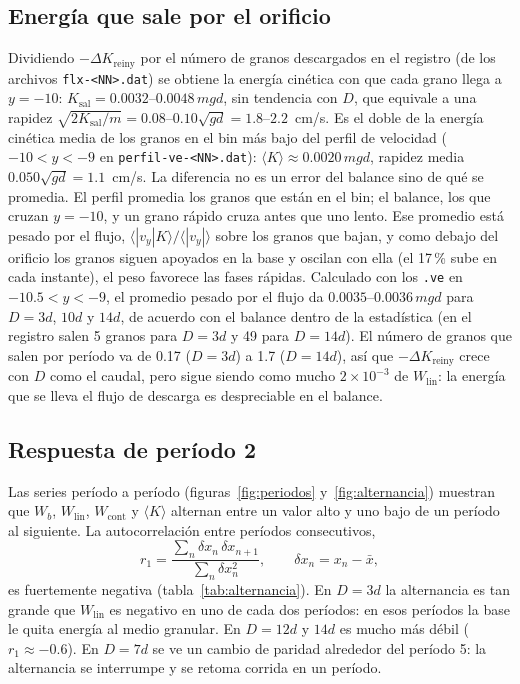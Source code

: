 \documentclass[11pt,a4paper]{article}
\newcommand{\code}[1]{\texttt{#1}}
\newcommand{\ave}[1]{\langle #1 \rangle}
\newcommand{\Wb}{W_b}
\newcommand{\Wlin}{W_\text{lin}}
\newcommand{\Wcont}{W_\text{cont}}
\newcommand{\dKr}{\Delta K_\text{reiny}}
\begin{document}
\subsection{Energía que sale por el orificio}

Dividiendo $-\dKr$ por el número de granos descargados en el registro
(de los archivos \code{flx-<NN>.dat}) se obtiene la energía cinética con que
cada grano llega a $y = -10$: $K_\text{sal} = 0.0032$--$0.0048\,mgd$, sin
tendencia con $D$, que equivale a una rapidez
$\sqrt{2K_\text{sal}/m} = 0.08$--$0.10\sqrt{gd} = 1.8$--$2.2$~cm/s.
Es el doble de la energía cinética media de los granos en el bin más bajo
del perfil de velocidad ($-10 < y < -9$ en \code{perfil-ve-<NN>.dat}):
$\ave{K} \approx 0.0020\,mgd$, rapidez media $0.050\sqrt{gd} =
1.1$~cm/s. La diferencia no es un error del balance sino de qué se
promedia. El perfil promedia los granos que están en el bin; el balance,
los que cruzan $y = -10$, y un grano rápido cruza antes que uno lento. Ese
promedio está pesado por el flujo, $\ave{|v_y| K}/\ave{|v_y|}$ sobre los
granos que bajan, y como debajo del orificio los granos siguen apoyados en
la base y oscilan con ella (el 17\,\% sube en cada instante), el peso
favorece las fases rápidas. Calculado con los \code{.ve} en
$-10.5 < y < -9$, el promedio pesado por el flujo da $0.0035$--$0.0036\,mgd$
para $D = 3d$, $10d$ y $14d$, de acuerdo con el balance dentro de la
estadística (en el registro salen 5 granos para $D = 3d$ y 49 para
$D = 14d$).
El número de granos que salen por período va de 0.17 ($D = 3d$) a 1.7
($D = 14d$), así que $-\dKr$ crece con $D$ como el caudal, pero sigue siendo
como mucho $2 \times 10^{-3}$ de $\Wlin$: la energía que se lleva el flujo de
descarga es despreciable en el balance.

\subsection{Respuesta de período 2}
\label{sec:periodo2}

Las series período a período (figuras~\ref{fig:periodos}
y~\ref{fig:alternancia}) muestran que $\Wb$, $\Wlin$, $\Wcont$ y $\ave{K}$
alternan entre un valor alto y uno bajo de un período al siguiente. La
autocorrelación entre períodos consecutivos,
\[
  r_1 = \frac{\sum_n \delta x_n\, \delta x_{n+1}}{\sum_n \delta x_n^2} ,
  \qquad \delta x_n = x_n - \bar x ,
\]
es fuertemente negativa (tabla~\ref{tab:alternancia}). En $D = 3d$ la
alternancia es tan grande que $\Wlin$ es negativo en uno de cada dos
períodos: en esos períodos la base le quita energía al medio granular. En
$D = 12d$ y $14d$ es mucho más débil ($r_1 \approx -0.6$). En $D = 7d$ se
ve un cambio de paridad alrededor del período 5: la alternancia se
interrumpe y se retoma corrida en un período.
\end{document}
